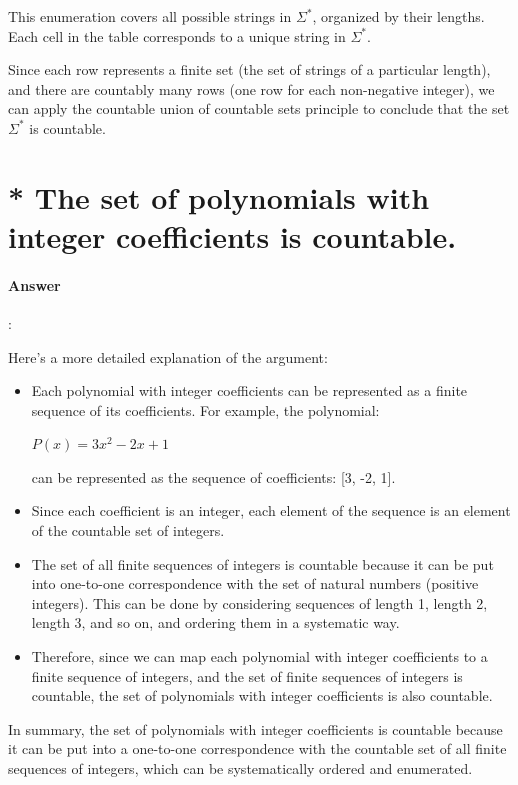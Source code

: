 \documentclass{article}
\begin{document}
This enumeration covers all possible strings in $\Sigma^*$, organized by their lengths. Each cell in the table corresponds to a unique string in $\Sigma^*$.

Since each row represents a finite set (the set of strings of a particular length), and there are countably many rows (one row for each non-negative integer), we can apply the countable union of countable sets principle to conclude that the set $\Sigma^*$ is countable.


\section{* The set of polynomials with integer coeﬀicients is countable.}

\paragraph{Answer}:

Here's a more detailed explanation of the argument:

\begin{itemize}
  \item Each polynomial with integer coefficients can be represented as a finite sequence of its coefficients. For example, the polynomial:

  $P(x) = 3x^2 - 2x + 1$
  
  can be represented as the sequence of coefficients: [3, -2, 1].
  
  \item Since each coefficient is an integer, each element of the sequence is an element of the countable set of integers.
  
  \item The set of all finite sequences of integers is countable because it can be put into one-to-one correspondence with the set of natural numbers (positive integers). This can be done by considering sequences of length 1, length 2, length 3, and so on, and ordering them in a systematic way.
  
  \item Therefore, since we can map each polynomial with integer coefficients to a finite sequence of integers, and the set of finite sequences of integers is countable, the set of polynomials with integer coefficients is also countable.
\end{itemize}

In summary, the set of polynomials with integer coefficients is countable because it can be put into a one-to-one correspondence with the countable set of all finite sequences of integers, which can be systematically ordered and enumerated.
\end{document}
